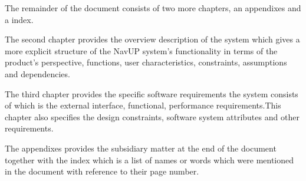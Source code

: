 The remainder of the document consists of two more chapters, an appendixes and a index.

The second chapter provides the overview description of the system which gives a more explicit structure of the NavUP system's functionality in terms of the product's perspective, functions, user characteristics, constraints, assumptions and dependencies.

The third chapter provides the specific software requirements the system consists of which is the external interface, functional, performance requirements.This chapter also specifies the design constraints, software system attributes and other requirements.

The appendixes provides the subsidiary matter at the end of the document together with the index which is a list of names or words which were mentioned in the document with reference to their page number.
